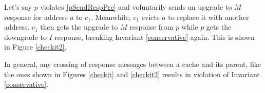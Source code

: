 Let's say $p$ violates \ref{pSendRespPre} and voluntarily sends an upgrade to
$M$ response for address $a$ to $c_1$.  Meanwhile, $c_1$ evicts $a$ to replace
it with another address. $c_1$ then gets the upgrade to $M$ response from $p$
while $p$ gets the downgrade to $I$ response, breaking Invariant
\ref{conservative} again. This is shown in Figure \ref{checkit2}.

In general, any crossing of response messages between a cache and its parent,
like the ones shown in Figures \ref{checkit} and \ref{checkit2} results in
violation of Invariant \ref{conservative}.
